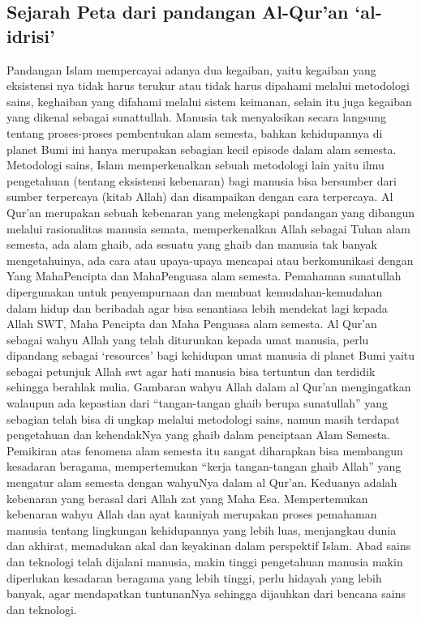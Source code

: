 \subsection {Sejarah Peta dari pandangan Al-Qur'an `al-idrisi'}
	Pandangan Islam mempercayai adanya dua kegaiban, yaitu kegaiban yang eksistensi nya tidak harus terukur atau tidak harus dipahami melalui metodologi sains, keghaiban yang difahami melalui sistem keimanan, selain itu juga kegaiban yang dikenal sebagai sunattullah. Manusia tak menyaksikan secara langsung tentang proses-proses pembentukan alam semesta, bahkan kehidupannya di planet Bumi ini hanya merupakan sebagian kecil episode dalam alam semesta.
	Metodologi sains, Islam memperkenalkan sebuah metodologi lain yaitu ilmu pengetahuan (tentang eksistensi kebenaran) bagi manusia bisa bersumber dari sumber terpercaya (kitab Allah) dan disampaikan dengan cara terpercaya. Al Qur’an merupakan sebuah kebenaran yang melengkapi pandangan yang dibangun melalui rasionalitas manusia semata, memperkenalkan Allah sebagai Tuhan alam semesta, ada alam ghaib, ada sesuatu yang ghaib dan manusia tak banyak mengetahuinya, ada cara atau upaya-upaya mencapai atau berkomunikasi dengan Yang MahaPencipta dan MahaPenguasa alam semesta. Pemahaman sunatullah dipergunakan untuk penyempurnaan dan membuat kemudahan-kemudahan dalam hidup dan beribadah agar bisa senantiasa lebih mendekat lagi kepada Allah SWT, Maha Pencipta dan Maha Penguasa alam semesta.
	Al Qur’an sebagai wahyu Allah yang telah diturunkan kepada umat manusia, perlu dipandang sebagai `resources' bagi kehidupan umat manusia di planet Bumi yaitu sebagai petunjuk Allah swt agar hati manusia bisa tertuntun dan terdidik sehingga berahlak mulia. Gambaran wahyu Allah dalam al Qur'an mengingatkan walaupun ada kepastian dari “tangan-tangan ghaib berupa sunatullah” yang sebagian telah bisa di ungkap melalui metodologi sains, namun masih terdapat pengetahuan dan kehendakNya yang ghaib dalam penciptaan Alam Semesta. 
	Pemikiran atas fenomena alam semesta itu sangat diharapkan bisa membangun kesadaran beragama, mempertemukan “kerja tangan-tangan ghaib Allah” yang mengatur alam semesta dengan wahyuNya dalam al Qur’an. Keduanya adalah kebenaran yang berasal dari Allah zat yang Maha Esa. Mempertemukan kebenaran wahyu Allah dan ayat kauniyah merupakan proses pemahaman manusia tentang lingkungan kehidupannya yang lebih luas, menjangkau dunia dan akhirat, memadukan akal dan keyakinan dalam perspektif Islam. 
	Abad sains dan teknologi telah dijalani manusia, makin tinggi pengetahuan manusia makin diperlukan kesadaran beragama yang lebih tinggi, perlu hidayah yang lebih banyak, agar mendapatkan tuntunanNya sehingga dijauhkan dari bencana sains dan teknologi. 

